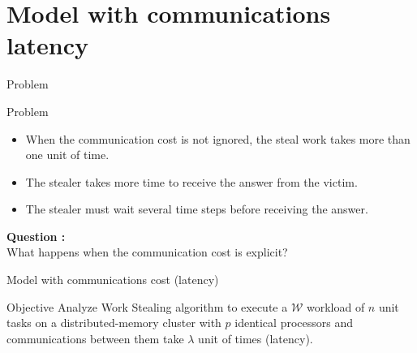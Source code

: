\documentclass{beamer}
\begin{document}
\section{Model with communications latency}
\begin{frame}{Problem}
    \begin{alertblock}{Problem}
        \begin{itemize}
            \item When the communication cost is not ignored, the steal work takes more than one unit of time. \\
            \item The stealer takes more time to receive the answer from the victim. 
            \item The stealer must wait several time steps before receiving the answer. 
        \end{itemize}
    \end{alertblock}
    \textbf{Question :}
    \\
        What happens when the communication cost is explicit?
\end{frame} 


\begin{frame}{Model with communications cost (latency)}
    \begin{alertblock}{Objective}
        Analyze \alert{Work Stealing} algorithm to execute a $\mathcal{W}$ workload of $n$ unit tasks on a distributed-memory cluster with $p$ identical processors and communications between them take \alert{$\lambda$} unit of times (latency).
    \end{alertblock}
\end{frame}
\end{document}

